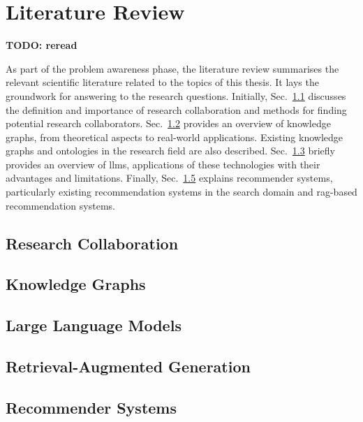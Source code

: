 \chapter{Literature Review}\label{chap:literature-review}

\textbf{TODO: reread}

As part of the problem awareness phase, the literature review summarises the relevant scientific literature related to the topics of this thesis.
It lays the groundwork for answering to the research questions.
Initially, Sec.~\ref{sec:research-collaboration} discusses the definition and importance of research collaboration and methods for finding potential research collaborators.
Sec.~\ref{sec:knowledge-graphs} provides an overview of knowledge graphs, from theoretical aspects to real-world applications.
Existing knowledge graphs and ontologies in the research field are also described.
Sec.~\ref{sec:large-language-models} briefly provides an overview of \glspl{llm}, applications of these technologies with their advantages and limitations.
Finally, Sec.~\ref{sec:recommender-systems} explains recommender systems, particularly existing recommendation systems in the search domain and \gls{rag}-based recommendation systems.
%
\section{Research Collaboration}\label{sec:research-collaboration}

%
\section{Knowledge Graphs}\label{sec:knowledge-graphs}

%
\section{Large Language Models}\label{sec:large-language-models}

%
\section{Retrieval-Augmented Generation}\label{sec:retrieval-augmented-generation}

%
\section{Recommender Systems}\label{sec:recommender-systems}
